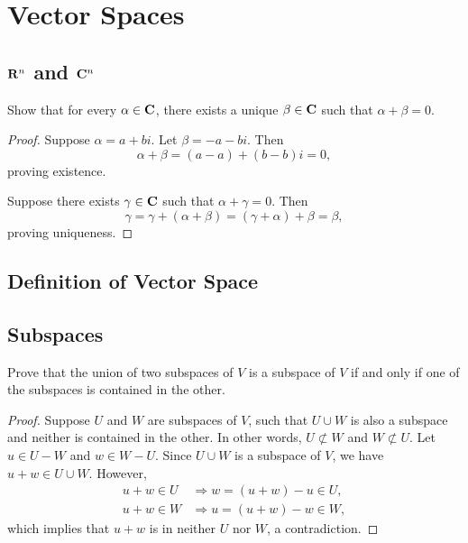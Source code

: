 \chapter{Vector Spaces}


\section{\texorpdfstring{$\mathbf{R}^{n}$}{R\^{}n} and \texorpdfstring{$\mathbf{C}^{n}$}{C\^{}n}}

\begin{exercise}{7}
	Show that for every \( \alpha \in \mathbf{C} \), there exists a unique \( \beta \in \mathbf{C} \)
	such that \( \alpha + \beta = 0 \).
\end{exercise}

\begin{proof}
	Suppose \( \alpha = a + bi \). Let \( \beta = -a - bi \). Then
	\[
		\alpha + \beta = (a - a) + (b - b)i = 0,
	\]
	proving existence.

	Suppose there exists \( \gamma \in \mathbf{C} \) such that \( \alpha + \gamma = 0 \). Then
	\[
		\gamma = \gamma + (\alpha + \beta) = (\gamma + \alpha) + \beta = \beta,
	\]
	proving uniqueness.
\end{proof}



\section{Definition of Vector Space}



\section{Subspaces}

\begin{exercise}{12}
	Prove that the union of two subspaces of \( V \) is a subspace of \( V \) if
	and only if one of the subspaces is contained in the other.
\end{exercise}

\begin{proof}
	Suppose \( U \) and \( W \) are subspaces of \( V \), such that \( U \cup W \)
	is also a subspace and neither is contained in the other.
	In other words, \( U \not\subset W \) and \( W \not\subset U \).
	Let \( u \in U - W \) and \( w \in W - U \).
	Since \( U \cup W \) is a subspace of \( V \), we have \( u + w \in U \cup W \).
	However,
	\begin{align*}
		u + w \in U &\Rightarrow w = (u + w) - u \in U, \\
		u + w \in W &\Rightarrow u = (u + w) - w \in W,
	\end{align*}
	which implies that \( u + w \) is in neither \( U \) nor \( W \), a contradiction.
\end{proof}

